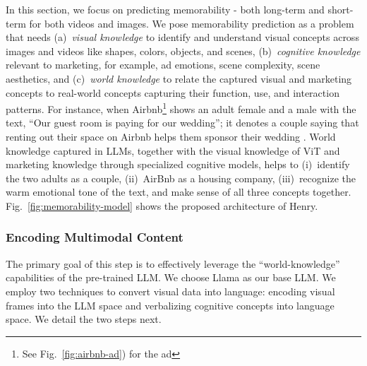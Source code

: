 In this section, we focus on predicting memorability - both long-term and short-term for both videos and images. We pose memorability prediction as a problem that needs (a)~\textit{visual knowledge} to identify and understand visual concepts across images and videos like shapes, colors, objects, and scenes, (b)~\textit{cognitive knowledge} relevant to marketing, for example, ad emotions, scene complexity, scene aesthetics, and (c)~\textit{world knowledge} to relate the captured visual and marketing concepts to real-world concepts capturing their function, use, and interaction patterns. %
For instance, when Airbnb\footnote{See Fig.~\ref{fig:airbnb-ad}) for the ad} shows an adult female and a male with the text, ``Our guest room is paying for our wedding''; it denotes a couple saying that renting out their space on Airbnb helps them sponsor their wedding \cite{kumar2023persuasion}. World knowledge captured in LLMs, together with the visual knowledge of ViT and marketing knowledge through specialized cognitive models, helps to (i)~identify the two adults as a couple, (ii)~AirBnb as a housing company, (iii)~recognize the warm emotional tone of the text, and make sense of all three concepts together. Fig.~\ref{fig:memorability-model} shows the proposed architecture of Henry. %





\subsubsection{Encoding Multimodal Content}
\label{sec:Encoding Visual Content}
The primary goal of this step is to effectively leverage the ``world-knowledge'' capabilities of the pre-trained LLM. We choose Llama \cite{touvron2023llama} as our base LLM. We employ two techniques to convert visual data into language: encoding visual frames into the LLM space and verbalizing cognitive concepts into language space. We detail the two steps next.

